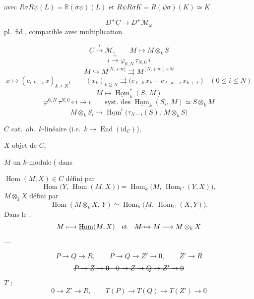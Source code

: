 \documentclass[11pt,a4paper]{article}
\begin{document}
avec $R\sigma R\psi(L) = \mathbb{R}(\sigma\psi)(L)$ et $R\psi R\sigma K = R(\psi\sigma)(K) \simeq K$.


\[
D^{+}C \longrightarrow D^{+}\mathcal{M}_\omega
\]
pl.\ fid., compatible avec multiplication.

\[
C \xrightarrow{\;i\;} \mathcal{M}, \qquad M \longmapsto M\otimes_k S
\]
\[
i \xrightarrow{\;\sim\;} \varphi_{0,N}\,\tau_{N,0}\, i
\]
\[
M \hookrightarrow M^{[N,+\infty[} \rightrightarrows M^{[N,+\infty]\times\mathbb{N}}
\]
\[
x \longmapsto (c_{i,k-i}\,x)_{k\geq N}, \qquad
(x_k)_{k\geq N} \rightrightarrows \bigl(c_{\ell,k}\,x_k - c_{\ell,k-i}\,x_{k+\ell}\bigr)
\quad (0\leq i\leq N)
\]
\[
M \longmapsto \underline{\operatorname{Hom}}^{*}_{k}(S,\,M)
\]
\[
\varphi^{0,N}\,\tau^{N,0}\circ i \longrightarrow i \qquad
\text{syst.\ des } \underline{\operatorname{Hom}}_k(S_i,\,M) \simeq S\otimes_k M
\]
\[
M\otimes_k S_i \longrightarrow \underline{\operatorname{Hom}}^{i}\bigl(\tau_{N-i}(S),\,M\otimes_k S\bigr)
\]

$C$ cat.\ ab.\ $k$-linéaire (i.e.\ $k \to \operatorname{End}(\mathrm{id}_C)$),

$X$ objet de $C$,

$M$ un $k$-module \ill{} (\ill{} dans

$\underline{\operatorname{Hom}}(M,X) \in C$ défini par
\[
\operatorname{Hom}\bigl(Y,\,\underline{\operatorname{Hom}}(M,X)\bigr) = \operatorname{Hom}_k\bigl(M,\,\operatorname{Hom}_C(Y,X)\bigr),
\]
$M\otimes_k X$ défini par
\[
\operatorname{Hom}(M\otimes_k X,\,Y) \simeq \operatorname{Hom}_k\bigl(M,\,\operatorname{Hom}_C(X,Y)\bigr).
\]
Dans le \ill{}  ;
\[
M \longmapsto \underline{\operatorname{Hom}}(M,X) \quad\text{et}\quad \text{\struck{$M\mapsto$}}\ M \longmapsto M\otimes_k X
\]
 —

\[
P \to Q \to R, \qquad P \to Q \to Z' \to 0, \qquad Z' \to R
\]
\[
\text{\struck{$P \to Z \to 0$\quad $0 \to Z \to Q \to Z' \to 0$}}
\]
 $T$ ;
\[
0 \to Z' \to R, \qquad T(P) \to T(Q) \to T(Z') \to 0
\]
\end{document}
